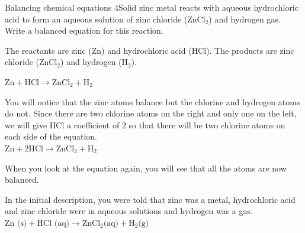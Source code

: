 	\par
\label{m38727*secfhsst!!!underscore!!!id967} 
      \noindent
\begin{wex}{Balancing chemical equations 4}{Solid zinc metal reacts with aqueous hydrochloric acid to form an aqueous solution of zinc chloride ($\text{ZnCl}_{2}$) and hydrogen gas. Write a balanced equation for this reaction.}

{
The reactants are zinc ($\text{Zn}$) and hydrochloric acid ($\text{HCl}$). The products are zinc chloride ($\text{ZnCl}_{2}$) and hydrogen ($\text{H}_{2}$).

${\text{Zn} + \text{HCl} \rightarrow \text{ZnCl}_{2} + \text{H}_{2}}$

You will notice that the zinc atoms balance but the chlorine and hydrogen atoms do not. Since there are two chlorine atoms on the right and only one on the left, we will give HCl a coefficient of 2 so that there will be two chlorine atoms on each side of the equation.\\
${\text{Zn} + 2\text{HCl} \rightarrow \text{ZnCl}_{2} + \text{H}_{2}}$

When you look at the equation again, you will see that all the atoms are now balanced.

In the initial description, you were told that zinc was a metal, hydrochloric acid and zinc chloride were in aqueous solutions and hydrogen was a gas.\\
$\text{Zn (s)} + \text{HCl (aq)} \rightarrow \text{ZnCl}_{2} \text{(aq)} + \text{H}_{2} \text{(g)}$
}
\end{wex}
    \noindent
\par
{}
